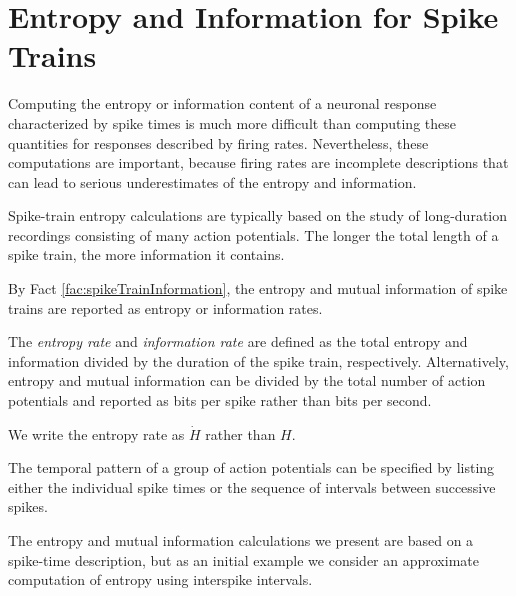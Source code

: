 \section{Entropy and Information for Spike Trains}
\label{sec:Entropy and Information for Spike Trains}


\begin{rem}
  Computing the entropy or information content of a neuronal response characterized by spike times is much more difficult than computing these quantities for responses described by firing rates. Nevertheless, these computations are important, because firing rates are incomplete descriptions that can lead to serious underestimates of the entropy and information.
\end{rem}

\begin{fac}
  \label{fac:spikeTrainInformation}
  Spike-train entropy calculations are typically based on the study of long-duration recordings consisting of many action potentials. The longer the total length of a spike train, the more information it contains.
\end{fac}

\begin{rem}
  By Fact \ref{fac:spikeTrainInformation}, the entropy and mutual information of spike trains are reported as entropy or information rates.
\end{rem}

\begin{defn}
  \label{def:entropyInformationRates}
  The \emph{entropy rate} and \emph{information rate} are defined as the total entropy and information divided by the duration of the spike train, respectively. Alternatively, entropy and mutual information can be divided by the total number of action potentials and reported as bits per spike rather than bits per second.
\end{defn}

\begin{ntn}
  We write the entropy rate as $\dot{H}$ rather than $H$.
\end{ntn}

\begin{fac}
  The temporal pattern of a group of action potentials can be specified by listing either the individual spike times or the sequence of intervals between successive spikes.
\end{fac}

\begin{rem}
  The entropy and mutual information calculations we present are based on a spike-time description, but as an initial example we consider an approximate computation of entropy using interspike intervals.
\end{rem}
